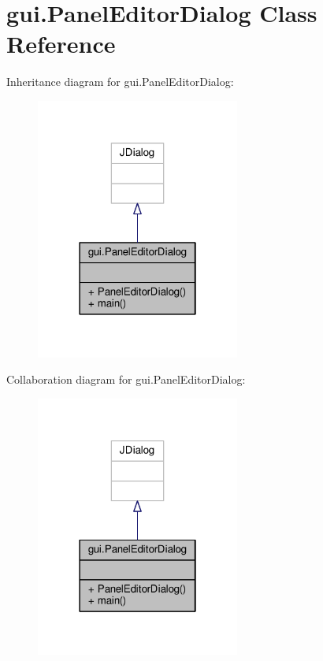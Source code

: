 \hypertarget{classgui_1_1PanelEditorDialog}{\section{gui.\-Panel\-Editor\-Dialog Class Reference}
\label{classgui_1_1PanelEditorDialog}
}


Inheritance diagram for gui.\-Panel\-Editor\-Dialog\-:\nopagebreak
\begin{figure}[H]
\begin{center}
\leavevmode
\includegraphics[width=190pt]{classgui_1_1PanelEditorDialog__inherit__graph}
\end{center}
\end{figure}


Collaboration diagram for gui.\-Panel\-Editor\-Dialog\-:\nopagebreak
\begin{figure}[H]
\begin{center}
\leavevmode
\includegraphics[width=190pt]{classgui_1_1PanelEditorDialog__coll__graph}
\end{center}
\end{figure}
